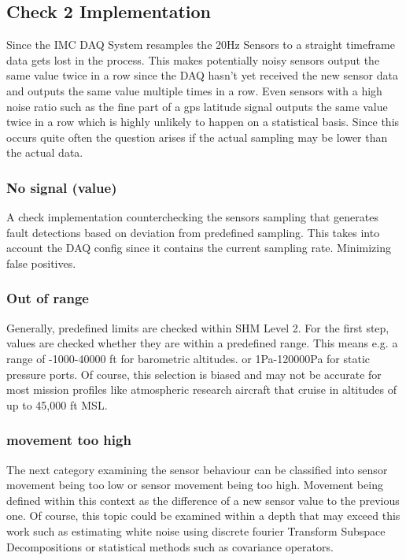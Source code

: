 \subsection{Check 2 Implementation}
Since the IMC DAQ System resamples the 20Hz Sensors to a straight timeframe data gets lost in the process. This makes potentially noisy sensors output the same value twice in a row since the DAQ hasn't yet received the new sensor data and outputs the same value multiple times in a row. Even sensors with a high noise ratio such as the fine part of a gps latitude signal outputs the same value twice in a row which is highly unlikely to happen on a statistical basis. Since this occurs quite often the question arises if the actual sampling may be lower than the actual data.

\subsubsection{ No signal (value)}
A check implementation counterchecking the sensors sampling that generates fault detections based on deviation from predefined sampling. This takes into account the DAQ config since it contains the current sampling rate. Minimizing false positives.

\subsubsection{Out of range}
Generally, predefined limits are checked within SHM Level 2. For the first step, values are checked whether they are within a predefined range. This means e.g. a range of -1000-40000 ft for barometric altitudes. or 1Pa-120000Pa for static pressure ports. Of course, this selection is biased and may not be accurate for most mission profiles like atmospheric research aircraft that cruise in altitudes of up to 45,000 ft MSL.

\subsubsection{movement too high}
The next category examining the sensor behaviour can be classified into sensor movement being too low or sensor movement being too high. Movement being defined within this context as the difference of a new sensor value to the previous one. Of course, this topic could be examined within a depth that may exceed this work such as estimating white noise using discrete fourier Transform Subspace Decompositions \cite{hendriks_noise_2008} or statistical methods such as covariance operators.

